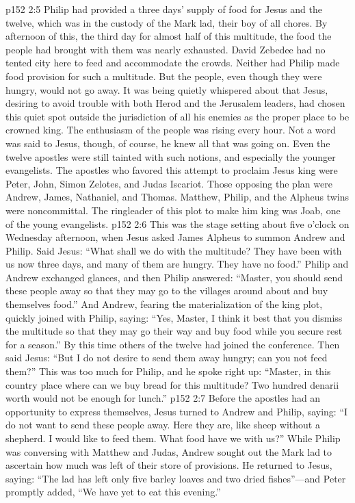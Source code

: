 \pc \vs p152 2:5 Philip had provided a three days’ supply of food for Jesus and the twelve, which was in the custody of the Mark lad, their boy of all chores. By afternoon of this, the third day for almost half of this multitude, the food the people had brought with them was nearly exhausted. David Zebedee had no tented city here to feed and accommodate the crowds. Neither had Philip made food provision for such a multitude. But the people, even though they were hungry, would not go away. It was being quietly whispered about that Jesus, desiring to avoid trouble with both Herod and the Jerusalem leaders, had chosen this quiet spot outside the jurisdiction of all his enemies as the proper place to be crowned king. The enthusiasm of the people was rising every hour. Not a word was said to Jesus, though, of course, he knew all that was going on. Even the twelve apostles were still tainted with such notions, and especially the younger evangelists. The apostles who favored this attempt to proclaim Jesus king were Peter, John, Simon Zelotes, and Judas Iscariot. Those opposing the plan were Andrew, James, Nathaniel, and Thomas. Matthew, Philip, and the Alpheus twins were noncommittal. The ringleader of this plot to make him king was Joab, one of the young evangelists.
\pc \vs p152 2:6 This was the stage setting about five o’clock on Wednesday afternoon, when Jesus asked James Alpheus to summon Andrew and Philip. Said Jesus: \textcolor{ubdarkred}{“What shall we do with the multitude? They have been with us now three days, and many of them are hungry. They have no food.”} Philip and Andrew exchanged glances, and then Philip answered: “Master, you should send these people away so that they may go to the villages around about and buy themselves food.” And Andrew, fearing the materialization of the king plot, quickly joined with Philip, saying: “Yes, Master, I think it best that you dismiss the multitude so that they may go their way and buy food while you secure rest for a season.” By this time others of the twelve had joined the conference. Then said Jesus: \textcolor{ubdarkred}{“But I do not desire to send them away hungry; can you not feed them?”} This was too much for Philip, and he spoke right up: “Master, in this country place where can we buy bread for this multitude? Two hundred denarii worth would not be enough for lunch.”
\vs p152 2:7 Before the apostles had an opportunity to express themselves, Jesus turned to Andrew and Philip, saying: \textcolor{ubdarkred}{“I do not want to send these people away. Here they are, like sheep without a shepherd. I would like to feed them. What food have we with us?”} While Philip was conversing with Matthew and Judas, Andrew sought out the Mark lad to ascertain how much was left of their store of provisions. He returned to Jesus, saying: “The lad has left only five barley loaves and two dried fishes”---and Peter promptly added, “We have yet to eat this evening.”
